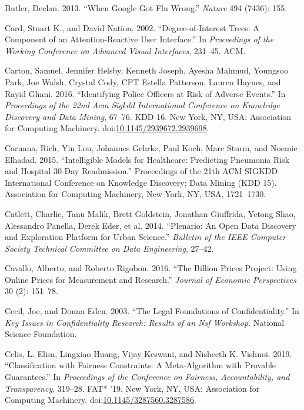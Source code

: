 \documentclass[]{krantz}
\begin{document}
\hypertarget{ref-butler2013google}{}
Butler, Declan. 2013. ``When Google Got Flu Wrong.'' \emph{Nature} 494
(7436): 155.

\hypertarget{ref-card2002degree}{}
Card, Stuart K., and David Nation. 2002. ``Degree-of-Interest Trees: A
Component of an Attention-Reactive User Interface.'' In
\emph{Proceedings of the Working Conference on Advanced Visual
Interfaces}, 231--45. ACM.

\hypertarget{ref-Carton2016}{}
Carton, Samuel, Jennifer Helsby, Kenneth Joseph, Ayesha Mahmud, Youngsoo
Park, Joe Walsh, Crystal Cody, CPT Estella Patterson, Lauren Haynes, and
Rayid Ghani. 2016. ``Identifying Police Officers at Risk of Adverse
Events.'' In \emph{Proceedings of the 22nd Acm Sigkdd International
Conference on Knowledge Discovery and Data Mining}, 67--76. KDD 16. New
York, NY, USA: Association for Computing Machinery.
doi:\href{https://doi.org/10.1145/2939672.2939698}{10.1145/2939672.2939698}.

\hypertarget{ref-Caruana2015}{}
Caruana, Rich, Yin Lou, Johannes Gehrke, Paul Koch, Marc Sturm, and
Noemie Elhadad. 2015. ``Intelligible Models for Healthcare: Predicting
Pneumonia Risk and Hospital 30-Day Readmission.'' Proceedings of the
21th ACM SIGKDD International Conference on Knowledge Discovery; Data
Mining (KDD 15). Association for Computing Machinery, New York, NY, USA,
1721--1730.

\hypertarget{ref-plenario}{}
Catlett, Charlie, Tanu Malik, Brett Goldstein, Jonathan Giuffrida,
Yetong Shao, Alessandro Panella, Derek Eder, et al. 2014. ``Plenario: An
Open Data Discovery and Exploration Platform for Urban Science.''
\emph{Bulletin of the IEEE Computer Society Technical Committee on Data
Engineering}, 27--42.

\hypertarget{ref-cavallo2016billion}{}
Cavallo, Alberto, and Roberto Rigobon. 2016. ``The Billion Prices
Project: Using Online Prices for Measurement and Research.''
\emph{Journal of Economic Perspectives} 30 (2): 151--78.

\hypertarget{ref-Cecil2003}{}
Cecil, Joe, and Donna Eden. 2003. ``The Legal Foundations of
Confidentiality.'' In \emph{Key Issues in Confidentiality Research:
Results of an Nsf Workshop}. National Science Foundation.

\hypertarget{ref-celis2019}{}
Celis, L. Elisa, Lingxiao Huang, Vijay Keswani, and Nisheeth K. Vishnoi.
2019. ``Classification with Fairness Constraints: A Meta-Algorithm with
Provable Guarantees.'' In \emph{Proceedings of the Conference on
Fairness, Accountability, and Transparency}, 319--28. FAT* '19. New
York, NY, USA: Association for Computing Machinery.
doi:\href{https://doi.org/10.1145/3287560.3287586}{10.1145/3287560.3287586}.
\end{document}
